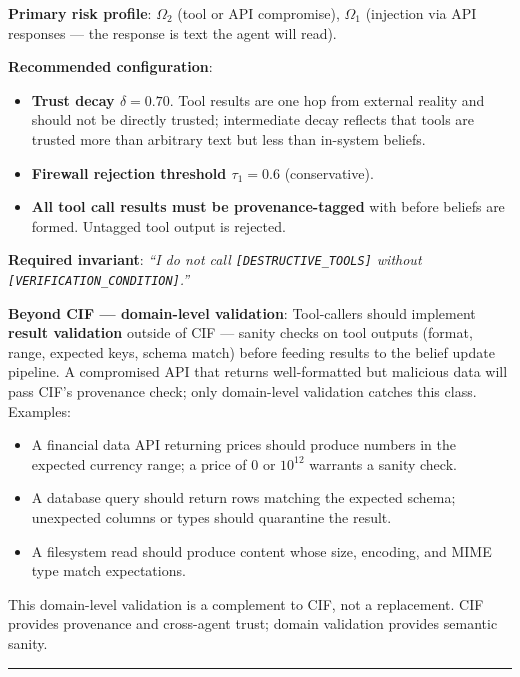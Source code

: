\documentclass[
]{article}
\providecommand{\tightlist}{%
  \setlength{\itemsep}{0pt}\setlength{\parskip}{0pt}}
\begin{document}
\textbf{Primary risk profile}: \(\Omega_2\) (tool or API compromise),
\(\Omega_1\) (injection via API responses --- the response is text the
agent will read).

\textbf{Recommended configuration}:

\begin{itemize}
\tightlist
\item
  \textbf{Trust decay \(\delta = 0.70\)}. Tool results are one hop from
  external reality and should not be directly trusted; intermediate
  decay reflects that tools are trusted more than arbitrary text but
  less than in-system beliefs.
\item
  \textbf{Firewall rejection threshold \(\tau_1 = 0.6\)} (conservative).
\item
  \textbf{All tool call results must be provenance-tagged} with
   before beliefs are
  formed. Untagged tool output is rejected.
\end{itemize}

\textbf{Required invariant}: \emph{``I do not call
\texttt{{[}DESTRUCTIVE\_TOOLS{]}} without
\texttt{{[}VERIFICATION\_CONDITION{]}}.''}

\textbf{Beyond CIF --- domain-level validation}: Tool-callers should
implement \textbf{result validation} outside of CIF --- sanity checks on
tool outputs (format, range, expected keys, schema match) before feeding
results to the belief update pipeline. A compromised API that returns
well-formatted but malicious data will pass CIF's provenance check; only
domain-level validation catches this class. Examples:

\begin{itemize}
\tightlist
\item
  A financial data API returning prices should produce numbers in the
  expected currency range; a price of \(0\) or \(10^{12}\) warrants a
  sanity check.
\item
  A database query should return rows matching the expected schema;
  unexpected columns or types should quarantine the result.
\item
  A filesystem read should produce content whose size, encoding, and
  MIME type match expectations.
\end{itemize}

This domain-level validation is a complement to CIF, not a replacement.
CIF provides provenance and cross-agent trust; domain validation
provides semantic sanity.

\begin{center}\rule{0.5\linewidth}{0.5pt}\end{center}
\end{document}

